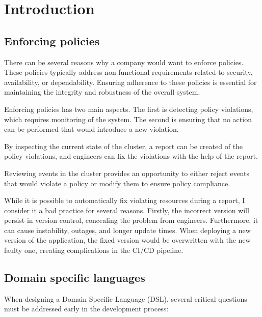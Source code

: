 \setlength{\parindent}{0pt}
\setlength{\parskip}{0.6em}

\chapter{Introduction}
\label{chap:intro}

\section{Enforcing policies}

There can be several reasons why a company would want to enforce policies. These policies typically address non-functional requirements related to security, availability, or dependability. Ensuring adherence to these policies is essential for maintaining the integrity and robustness of the overall system.

Enforcing policies has two main aspects. The first is detecting policy violations, which requires monitoring of the system. The second is ensuring that no action can be performed that would introduce a new violation.

By inspecting the current state of the cluster, a report can be created of the policy violations, and engineers can fix the violations with the help of the report.

Reviewing events in the cluster provides an opportunity to either reject events that would violate a policy or modify them to ensure policy compliance.

While it is possible to automatically fix violating resources during a report, I consider it a bad practice for several reasons. Firstly, the incorrect version will persist in version control, concealing the problem from engineers. Furthermore, it can cause instability, outages, and longer update times. When deploying a new version of the application, the fixed version would be overwritten with the new faulty one, creating complications in the CI/CD pipeline.

\section{Domain specific languages}

When designing a Domain Specific Language (DSL), several critical questions must be addressed early in the development process:

